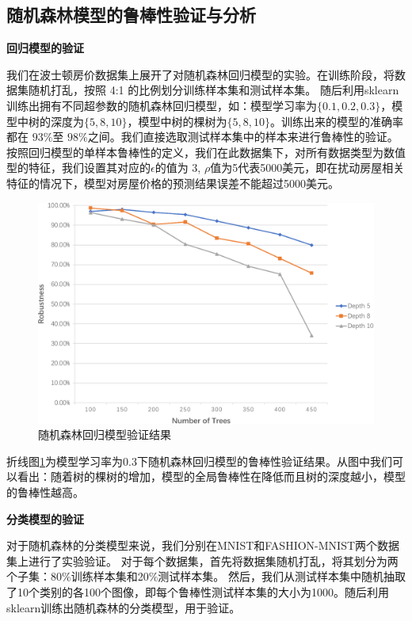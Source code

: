 \subsection{随机森林模型的鲁棒性验证与分析}

\textbf{回归模型的验证}

我们在波士顿房价数据集上展开了对随机森林回归模型的实验。在训练阶段，将数据集随机打乱，按照 4:1 的比例划分训练样本集和测试样本集。 随后利用sklearn训练出拥有不同超参数的随机森林回归模型，如：模型学习率为$\{0.1,0.2,0.3\}$，模型中树的深度为$\{5,8,10\}$，模型中树的棵树为$\{5,8,10\}$。训练出来的模型的准确率都在 $93\%$至 $98\%$之间。我们直接选取测试样本集中的样本来进行鲁棒性的验证。按照回归模型的单样本鲁棒性的定义，我们在此数据集下，对所有数据类型为数值型的特征，我们设置其对应的$\epsilon$的值为 3, $\rho$值为5代表5000美元，即在扰动房屋相关特征的情况下，模型对房屋价格的预测结果误差不能超过5000美元。

\begin{figure}[!hbt]
\centering
	\includegraphics[scale=0.65]{fig2/C5/RF_regression_crop.pdf}
	\caption{随机森林回归模型验证结果}
	\label{fig:rf_regression}	
\end{figure}

折线图\ref{fig:rf_regression}为模型学习率为0.3下随机森林回归模型的鲁棒性验证结果。从图中我们可以看出：随着树的棵树的增加，模型的全局鲁棒性在降低而且树的深度越小，模型的鲁棒性越高。

\textbf{分类模型的验证}

对于随机森林的分类模型来说，我们分别在MNIST和FASHION-MNIST两个数据集上进行了实验验证。 对于每个数据集，首先将数据集随机打乱，将其划分为两个子集：80$\%$训练样本集和20$\%$测试样本集。 然后，我们从测试样本集中随机抽取了10个类别的各100个图像，即每个鲁棒性测试样本集的大小为1000。随后利用 sklearn训练出随机森林的分类模型，用于验证。

